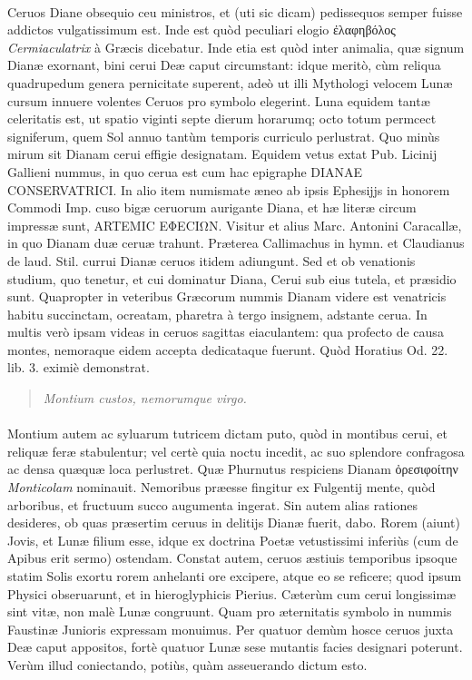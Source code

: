 \documentclass[a4paper, 11pt, oneside, polutonikogreek, latin]{article}
\begin{document}
\paragraph{}
Ceruos Diane obsequio ceu ministros, et (uti sic dicam) pedissequos semper fuisse addictos vulgatissimum est. Inde est quòd peculiari elogio ἐλαφηβόλος \emph{Cermiaculatrix} à Græcis dicebatur. Inde etia est quòd inter animalia, quæ signum Dianæ exornant, bini cerui Deæ caput circumstant: idque meritò, cùm reliqua quadrupedum genera pernicitate superent, adeò ut illi Mythologi velocem Lunæ cursum innuere volentes Ceruos pro symbolo elegerint. Luna equidem tantæ celeritatis est, ut spatio viginti septe dierum horarumq; octo totum permcect signiferum, quem Sol annuo tantùm temporis curriculo perlustrat. Quo minùs mirum sit Dianam cerui effigie designatam. Equidem vetus extat Pub. Licinij Gallieni nummus, in quo cerua est cum hac epigraphe DIANAE CONSERVATRICI. In alio item numismate æneo ab ipsis Ephesijjs in honorem Commodi Imp. cuso bigæ ceruorum aurigante Diana, et hæ literæ circum impressæ sunt, ARTEMIC EΦECIΩN. Visitur et alius Marc. Antonini Caracallæ, in quo Dianam duæ ceruæ trahunt. Præterea Callimachus in hymn. et Claudianus de laud. Stil. currui Dianæ ceruos itidem adiungunt. Sed et ob venationis studium, quo tenetur, et cui dominatur Diana, Cerui sub eius tutela, et præsidio sunt. Quapropter in veteribus Græcorum nummis Dianam videre est venatricis habitu succinctam, ocreatam, pharetra à tergo insignem, adstante cerua. In multis verò ipsam videas in ceruos sagittas eiaculantem: qua profecto de causa montes, nemoraque eidem accepta dedicataque fuerunt. Quòd Horatius Od. 22. lib. 3. eximiè demonstrat.
\begin{quote}
\emph{Montium custos, nemorumque virgo.}
\end{quote}
\vspace*{-4mm}
\paragraph{}
Montium autem ac syluarum tutricem dictam puto, quòd in montibus cerui, et reliquæ feræ stabulentur; vel certè quia noctu incedit, ac suo splendore confragosa ac densa quæquæ loca perlustret. Quæ Phurnutus respiciens Dianam ὀρεσιφοίτην \emph{Monticolam} nominauit. Nemoribus præesse fingitur ex Fulgentij mente, quòd arboribus, et fructuum succo augumenta ingerat. Sin autem alias rationes desideres, ob quas præsertim ceruus in delitijs Dianæ fuerit, dabo. Rorem (aiunt) Jovis, et Lunæ filium esse, idque ex doctrina Poetæ vetustissimi inferiùs (cum de Apibus erit sermo) ostendam. Constat autem, ceruos æstiuis temporibus ipsoque statim Solis exortu rorem anhelanti ore excipere, atque eo se reficere; quod ipsum Physici obseruarunt, et in hieroglyphicis Pierius. Cæterùm cum cerui longissimæ sint vitæ, non malè Lunæ congruunt. Quam pro æternitatis symbolo in nummis Faustinæ Junioris expressam monuimus. Per quatuor demùm hosce ceruos juxta Deæ caput appositos, fortè quatuor Lunæ sese mutantis facies designari poterunt. Verùm illud coniectando, potiùs, quàm asseuerando dictum esto.
\clearpage
\end{document}
